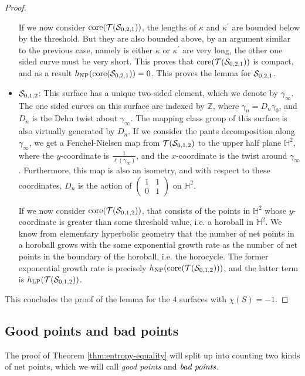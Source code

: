 \begin{proof}
\begin{itemize}
    If we now consider $\mathrm{core}(\mathcal{T}(\mathcal{S}_{0,2,1}))$, the lengths of $\kappa$ and $\kappa^{\prime}$ are bounded below by the threshold.
    But they are also bounded above, by an argument similar to the previous case, namely is either $\kappa$ or $\kappa^{\prime}$ are very long, the other one sided curve must be very short.
    This proves that $\mathrm{core}(\mathcal{T}(\mathcal{S}_{0,2,1}))$ is compact, and as a result $h_{\mathrm{NP}}(\mathrm{core}(\mathcal{S}_{0,2,1})) = 0$.
    This proves the lemma for $\mathcal{S}_{0,2,1}$.
  \item $\mathcal{S}_{0,1,2}$: This surface has a unique two-sided element, which we denote by $\gamma_{\infty}$.
    The one sided curves on this surface are indexed by $\mathbb{Z}$, where $\gamma_n = D_n \gamma_0$, and $D_n$ is the Dehn twist about $\gamma_\infty$.
    The mapping class group of this surface is also virtually generated by $D_n$.
    If we consider the pants decomposition along $\gamma_{\infty}$, we get a Fenchel-Nielsen map from $\mathcal{T}(\mathcal{S}_{0,1,2})$ to the upper half plane $\mathbb{H}^2$, where the $y$-coordinate is $\frac{1}{\ell(\gamma_{\infty})}$, and the $x$-coordinate is the twist around $\gamma_{\infty}$.
    Furthermore, this map is also an isometry, and with respect to these coordinates, $D_n$ is the action of $
    \begin{pmatrix}
      1 & 1 \\
      0 & 1
    \end{pmatrix}
    $ on $\mathbb{H}^2$.

    If we now consider $\mathrm{core}(\mathcal{T}(\mathcal{S}_{0,1,2}))$, that consists of the points in $\mathbb{H}^2$ whose $y$-coordinate is greater than some threshold value, i.e. a horoball in $\mathbb{H}^2$.
    We know from elementary hyperbolic geometry that the number of net points in a horoball grows with the same exponential growth rate as the number of net points in the boundary of the horoball, i.e. the horocycle.
    The former exponential growth rate is precisely $h_{\mathrm{NP}}(\mathrm{core}(\mathcal{T}(\mathcal{S}_{0,1,2})))$, and the latter term is $h_{\mathrm{LP}}(\mathcal{T}(\mathcal{S}_{0,1,2}))$.
  \end{itemize}
  This concludes the proof of the lemma for the $4$ surfaces with $\chi(S) = -1$.
\end{proof}

\subsection{Good points and bad points}
\label{sec:good-points-bad}

The proof of Theorem \ref{thm:entropy-equality} will split up into counting two kinds of net points, which we will call \emph{good points} and $\emph{bad points}$.

